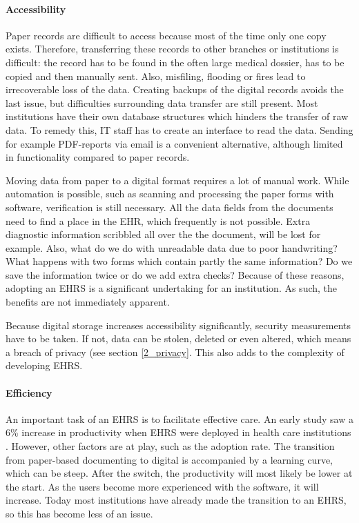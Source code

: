         \paragraph{Accessibility} Paper records are difficult to access because most of the time only one copy exists. Therefore, transferring these records to other branches or institutions is difficult: the record has to be found in the often large medical dossier, has to be copied and then manually sent. Also, misfiling, flooding or fires lead to irrecoverable loss of the data. Creating backups of the digital records avoids the last issue, but difficulties surrounding data transfer are still present. Most institutions have their own database structures which hinders the transfer of raw data. To remedy this, IT staff has to create an interface to read the data. Sending for example PDF-reports via email is a convenient alternative, although limited in functionality compared to paper records.

        Moving data from paper to a digital format requires a lot of manual work. While automation is possible, such as scanning and processing the paper forms with software, verification is still necessary. All the data fields from the documents need to find a place in the EHR, which frequently is not possible. Extra diagnostic information scribbled all over the the document, will be lost for example. Also, what do we do with unreadable data due to poor handwriting? What happens with two forms which contain partly the same information? Do we save the information twice or do we add extra checks? Because of these reasons, adopting an EHRS is a significant undertaking for an institution. As such, the benefits are not immediately apparent.

        Because digital storage increases accessibility significantly, security measurements have to be taken. If not, data can be stolen, deleted or even altered, which means a breach of privacy (see section \ref{2_privacy}. This also adds to the complexity of developing EHRS. 

        \paragraph{Efficiency} An important task of an EHRS is to facilitate effective care. An early study saw a 6\% increase in productivity when EHRS were deployed in health care institutions \cite{ehrs_efficiency}. However, other factors are at play, such as the adoption rate. The transition from paper-based documenting to digital is accompanied by a learning curve, which can be steep. After the switch, the productivity will most likely be lower at the start. As the users become more experienced with the software, it will increase. Today most institutions have already made the transition to an EHRS, so this has become less of an issue.

